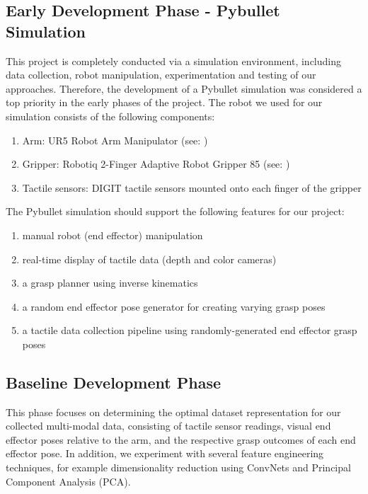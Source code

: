 \documentclass[12pt, a4paper]{report}
\theoremstyle{definition}
\begin{document}
\subsection{Early Development Phase - Pybullet Simulation}
\label{sec:1.4.2}
This project is completely conducted via a simulation environment, including data collection, robot manipulation, experimentation and testing of our approaches. Therefore, the development of a Pybullet simulation was considered a top priority in the early phases of the project. The robot we used for our simulation consists of the following components:
\begin{enumerate}
    \item Arm: UR5 Robot Arm Manipulator (see: \cite{ur5})
    \item Gripper: Robotiq 2-Finger Adaptive Robot Gripper 85 (see: \cite{robotiq})
    \item Tactile sensors: DIGIT tactile sensors \cite{digit} mounted onto each finger of the gripper
\end{enumerate}
The Pybullet simulation should support the following features for our project:
\begin{enumerate}
    \item manual robot (end effector) manipulation
    \item real-time display of tactile data (depth and color cameras)
    \item a grasp planner using inverse kinematics
    \item a random end effector pose generator for creating varying grasp poses
    \item a tactile data collection pipeline using randomly-generated end effector grasp poses
\end{enumerate}

\subsection{Baseline Development Phase}
\label{sec:1.4.3}
This phase focuses on determining the optimal dataset representation for our collected multi-modal data, consisting of tactile sensor readings, visual end effector poses relative to the arm, and the respective grasp outcomes of each end effector pose. In addition, we experiment with several feature engineering techniques, for example dimensionality reduction using ConvNets and Principal Component Analysis (PCA).
\end{document}
